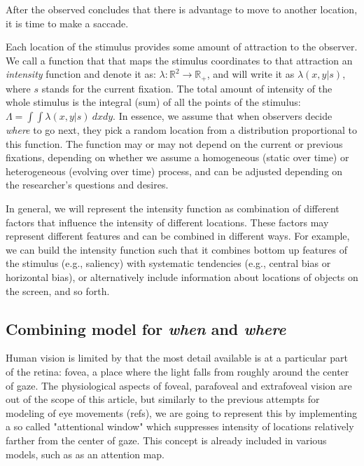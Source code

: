 \documentclass{article}
\begin{document}
After the observed concludes that there is advantage to move to another location, it is time to make a saccade.

Each location of the stimulus provides some amount of attraction to the observer. We call a function that that maps the stimulus coordinates to that attraction an \textit{intensity} function and denote it as: $\lambda: \mathbb{R}^2 \rightarrow \mathbb{R}_+$, and will write it as $\lambda(x, y | s)$, where $s$ stands for the current fixation. The total amount of intensity of the whole stimulus is the integral (sum) of all the points of the stimulus: $\Lambda = \int\int \lambda(x, y | s)~dx dy$. In essence, we assume that when observers decide \textit{where} to go next, they pick a random location from a distribution proportional to this function. The function may or may not depend on the current or previous fixations, depending on whether we assume a homogeneous (static over time) or heterogeneous (evolving over time) process, and can be adjusted depending on the researcher's questions and desires.

In general, we will represent the intensity function as combination of different factors that influence the intensity of different locations. These factors may represent different features and can be combined in different ways. For example, we can build the intensity function such that it combines bottom up features of the stimulus (e.g., saliency) with systematic tendencies (e.g., central bias or horizontal bias), or alternatively include information about locations of objects on the screen, and so forth.


\subsection{Combining model for \textit{when} and \textit{where}}

Human vision is limited by that the most detail available is at a particular part of the retina: fovea, a place where the light falls from roughly around the center of gaze. The physiological aspects of foveal, parafoveal and extrafoveal vision are out of the scope of this article, but similarly to the previous attempts for modeling of eye movements (refs), we are going to represent this by implementing a so called "attentional window" which suppresses intensity of locations relatively farther from the center of gaze. This concept is already included in various models, such as \citep{trukenbrod2014icat, schutt2017likelihood,schwetlick2020ccenewalk_extendeds} as an attention map.
\end{document}
